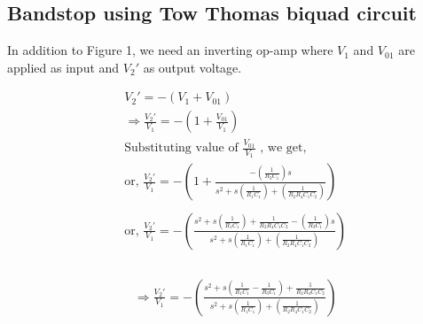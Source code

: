 \documentclass[a4paper,11pt]{article}
\newcommand\ddfrac[2]{\frac{\displaystyle #1}{\displaystyle #2}}
\begin{document}
\subsection*{Bandstop using Tow Thomas biquad circuit}
In addition to Figure 1, we need an inverting op-amp where $V_1$ and $V_{01}$ are applied as input and $V_2'$ as output voltage.

\begin{equation*}
    \begin{aligned}
         & V_2'                          =-(V_1+V_{01})                                                                                                                                                                          \\
         & \Rightarrow \frac{V_2'}{V_1}  =-\left(1+\frac{V_{01}}{V_1}\right)                                                                                                                                                     \\
         & \text{Substituting value of $\ddfrac{V_{01}}{V_1}$ , we get,}                                                                                                                                                         \\
         & \text{or, }\frac{V_2'}{V_{1}}=-\left(1+\ddfrac{-\left(\frac{1}{R_3C_1}\right)s}{s^2+s\left(\frac{1}{R_1C_1}\right)+\left(\frac{1}{R_2R_4C_1C_2}\right)}\right)                                                        \\\\
         & \text{or, }\frac{V_2'}{V_{1}}=-\left(\ddfrac{s^2+s\left(\frac{1}{R_1C_1}\right)+\frac{1}{R_2R_4C_1C_2}-\left(\frac{1}{R_3C_1}\right)s}{s^2+s\left(\frac{1}{R_1C_1}\right)+\left(\frac{1}{R_2R_4C_1C_2}\right)}\right) \\\\
    \end{aligned}
\end{equation*}

\begin{equation*}
    \begin{aligned}
         & \Rightarrow\frac{V_2'}{V_{1}}=-\left(\ddfrac{s^2+s\left(\frac{1}{R_1C_1}-\frac{1}{R_3C_1}\right)+\frac{1}{R_2R_4C_1C_2}}{s^2+s\left(\frac{1}{R_1C_1}\right)+\left(\frac{1}{R_2R_4C_1C_2}\right)}\right)
    \end{aligned}
\end{equation*}
\end{document}
